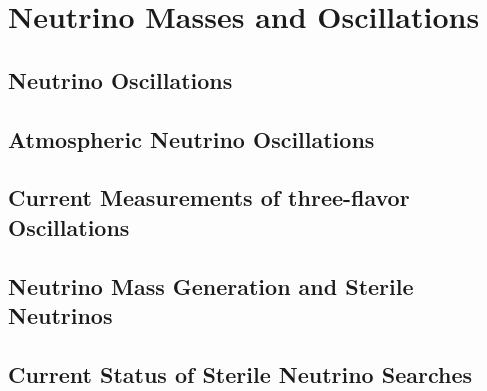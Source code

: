 \setchapterpreamble[u]{\margintoc}
\chapter{Neutrino Masses and Oscillations}

\section{Neutrino Oscillations}
\section{Atmospheric Neutrino Oscillations}
\section{Current Measurements of three-flavor Oscillations}
\section{Neutrino Mass Generation and Sterile Neutrinos}
\section{Current Status of Sterile Neutrino Searches}